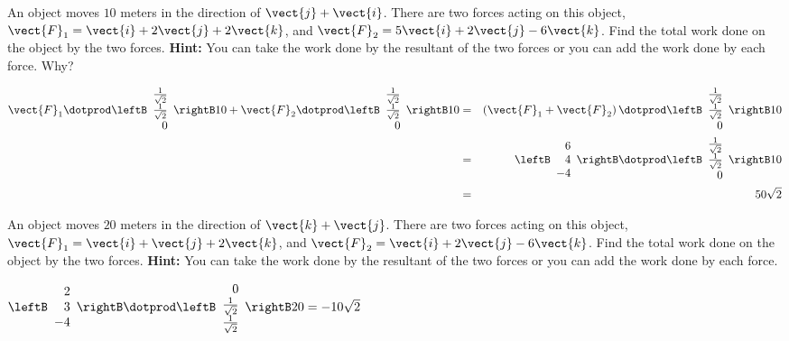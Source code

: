 \begin{enumialphparenastyle}
\begin{ex} An object moves $10$ meters in the direction of $\vect{j}+\vect{i}$. There
are two forces acting on this object, $\vect{F}_{1}=\vect{i}+2\vect{j}
+2\vect{k}$, and $\vect{F}_{2}=5\vect{i}+2\vect{j}-6\vect{k}$.
Find the total work done on the object by the two forces. \textbf{Hint: }You
can take the work done by the resultant of the two forces or you can add the
work done by each force. Why?
\begin{sol}
\begin{eqnarray*}
\vect{F}_{1}\dotprod \leftB \begin{array}{r}
 \frac{1}{\sqrt{2}} \\
\frac{1}{\sqrt{2}} \\
0
\end{array}
\rightB 10+\vect{F}_{2}\dotprod  \leftB \begin{array}{r}
 \frac{1}{\sqrt{2}} \\
 \frac{1}{\sqrt{2}} \\
 0
\end{array}
\rightB 10 &=&\left( \vect{F}_{1}+\vect{F}_{2}\right)
\dotprod \leftB \begin{array}{r}
 \frac{1}{\sqrt{2}} \\
 \frac{1}{\sqrt{2}} \\
 0
\end{array}
\rightB 10 \\
&=& \leftB \begin{array}{r}
6 \\
4 \\
 -4
\end{array}
\rightB \dotprod \leftB \begin{array}{r}
 \frac{1}{\sqrt{2}} \\
 \frac{1}{\sqrt{2}} \\
 0
\end{array}
\rightB
10 \\
&=& 50\sqrt{2}
\end{eqnarray*}
\end{sol}
\end{ex}

\begin{ex} An object moves $20$ meters in the direction of $\vect{k}+\vect{j}$. There
are two forces acting on this object, $\vect{F}_{1}=\vect{i}+\vect{j}+
2\vect{k}$, and $\vect{F}_{2}=\vect{i}+2\vect{j}-6\vect{k}$. Find
the total work done on the object by the two forces. \textbf{Hint: }You can
take the work done by the resultant of the two forces or you can add the
work done by each force.
\begin{sol}
$\leftB \begin{array}{r}
2 \\
3 \\
-4
\end{array}
\rightB \dotprod \leftB \begin{array}{r}
0 \\
 \frac{1}{\sqrt{2}} \\
 \frac{1}{\sqrt{2}} 
\end{array}
\rightB 20= -10\sqrt{2}$
\end{sol}
\end{ex}

\end{enumialphparenastyle}